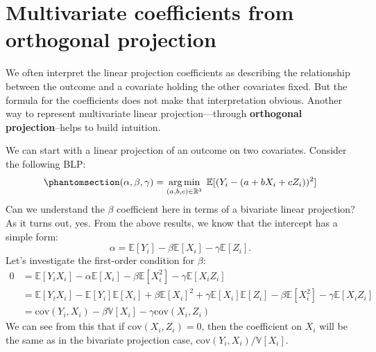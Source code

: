 \documentclass[
  13pt,
  letterpaper,
  DIV=11,
  numbers=noendperiod]{scrreprt}
\newcommand{\E}{\mathbb{E}}
\newcommand{\V}{\mathbb{V}}
\newcommand{\cov}{\text{cov}}
\DeclareMathOperator*{\argmin}{arg\,min}
\theoremstyle{plain}
\theoremstyle{plain}
\theoremstyle{definition}
\theoremstyle{definition}
\theoremstyle{remark}
\begin{document}
\section{Multivariate coefficients from orthogonal
projection}\label{sec-fwl}

We often interpret the linear projection coefficients as describing the
relationship between the outcome and a covariate holding the other
covariates fixed. But the formula for the coefficients does not make
that interpretation obvious. Another way to represent multivariate
linear projection---through \textbf{orthogonal projection}--helps to
build intuition.

We can start with a linear projection of an outcome on two covariates.
Consider the following BLP:
\begin{equation}\protect\phantomsection\label{eq-two-var-blp}{ 
(\alpha, \beta, \gamma) = \argmin_{(a,b,c) \in \mathbb{R}^{3}} \; \E[(Y_{i} - (a + bX_{i} + cZ_{i}))^{2}]
}\end{equation} Can we understand the \(\beta\) coefficient here in
terms of a bivariate linear projection? As it turns out, yes. From the
above results, we know that the intercept has a simple form: \[
\alpha = \E[Y_i] - \beta\E[X_i] - \gamma\E[Z_i].
\] Let's investigate the first-order condition for \(\beta\): \[ 
\begin{aligned}
  0 &= \E[Y_{i}X_{i}] - \alpha\E[X_{i}] - \beta\E[X_{i}^{2}] - \gamma\E[X_{i}Z_{i}] \\
    &= \E[Y_{i}X_{i}] - \E[Y_{i}]\E[X_{i}] + \beta\E[X_{i}]^{2} + \gamma\E[X_{i}]\E[Z_{i}] - \beta\E[X_{i}^{2}] - \gamma\E[X_{i}Z_{i}] \\
  &= \cov(Y_i, X_i) - \beta\V[X_{i}] - \gamma \cov(X_{i}, Z_{i})
\end{aligned}
\] We can see from this that if \(\cov(X_{i}, Z_{i}) = 0\), then the
coefficient on \(X_i\) will be the same as in the bivariate projection
case, \(\cov(Y_{i}, X_{i})/\V[X_{i}]\).
\end{document}
